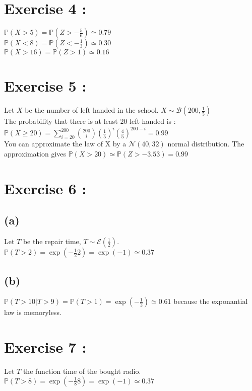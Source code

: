 \documentclass{article}
\begin{document}
\section*{Exercise 4 :}
$\mathbb{P}(X>5) = \mathbb{P}(Z>-\frac{5}{6}) \simeq 0.79 $
\\
$\mathbb{P}(X<8) = \mathbb{P}(Z<-\frac{1}{3}) \simeq 0.30 $
\\
$\mathbb{P}(X>16) = \mathbb{P}(Z>1) \simeq 0.16$
\section*{Exercise 5 :}
Let $X$ be the number of left handed in the school. $X\sim\mathcal{B}(200,\frac{1}{5})$
\\
The probability that there is at least 20 left handed is : $\mathbb{P}(X \ge 20) = \sum\limits_{i=20}^{200} \binom{200}{i}(\frac{1}{5})^i(\frac{4}{5})^{200-i} = 0.99$
\\
You can approximate the law of X by a $\mathcal{N}(40,32)$ normal distribution. The approximation gives $\mathbb{P}(X>20) \simeq \mathbb{P}(Z>-3.53) = 0.99$
\section*{Exercise 6 :}
\subsection*{(a)}
Let $T$ be the repair time, $T\sim\mathcal{E}(\frac{1}{2})$.
\\
$\mathbb{P}(T>2) = \exp(-\frac{1}{2}2) = \exp(-1)\simeq 0.37$
\subsection*{(b)}
$\mathbb{P}(T>10|T>9) = \mathbb{P}(T>1) = \exp(-\frac{1}{2})\simeq 0.61$ because the exponantial law is memoryless.
\section*{Exercise 7 :}
Let $T$ the function time of the bought radio.
$\mathbb{P}(T>8) = \exp(-\frac{1}{8}8) = \exp(-1)\simeq 0.37$
\end{document}
